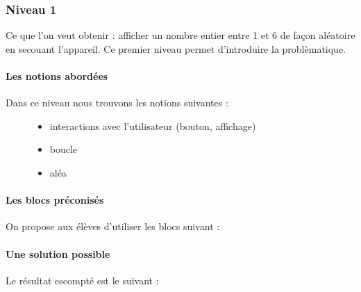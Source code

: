 \documentclass[letterpaper,10pt,french]{sphinxmanual}
\begin{document}
\subsubsection{Niveau 1}
\label{\detokenize{decouverte/de6faces-bloc1:niveau-1}}\label{\detokenize{decouverte/de6faces-bloc1::doc}}
Ce que l’on veut obtenir : afficher  un nombre entier entre 1 et 6 de façon aléatoire en secouant l’appareil.
Ce premier niveau permet d’introduire la problèmatique.


\paragraph{Les notions abordées}
\label{\detokenize{decouverte/de6faces-bloc1:les-notions-abordees}}\begin{description}
\item[{Dans ce niveau nous trouvons les notions suivantes :}] \leavevmode\begin{itemize}
\item {} 
interactions avec l’utilisateur (bouton, affichage)

\item {} 
boucle

\item {} 
aléa

\end{itemize}

\end{description}



\paragraph{Les blocs préconisés}
\label{\detokenize{decouverte/de6faces-bloc1:les-blocs-preconises}}
On propose aux élèves d’utiliser les blocs suivant :



\paragraph{Une solution possible}
\label{\detokenize{decouverte/de6faces-bloc1:une-solution-possible}}
Le résultat escompté est le suivant :
\end{document}
